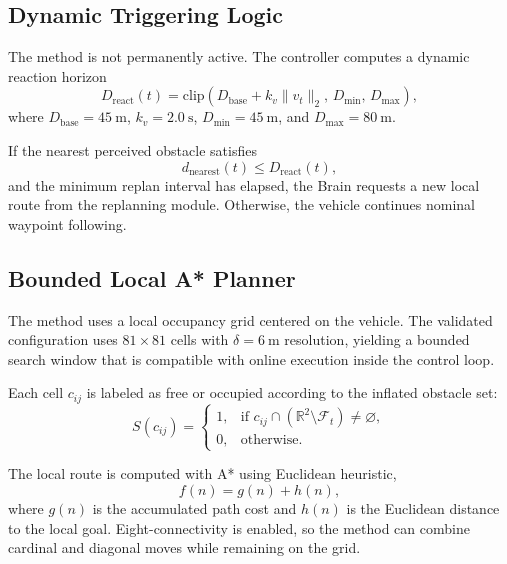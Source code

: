 \documentclass[a4paper,11pt]{article}
\begin{document}
\subsection{Dynamic Triggering Logic}

The method is not permanently active. The controller computes a dynamic reaction horizon
\begin{equation}
    D_{\mathrm{react}}(t) =
    \mathrm{clip}\!\left(D_{\mathrm{base}} + k_v \lVert v_t \rVert_2,\,
    D_{\min},\, D_{\max}\right),
\end{equation}
where \(D_{\mathrm{base}}=\SI{45}{\meter}\), \(k_v=\SI{2.0}{\second}\), \(D_{\min}=\SI{45}{\meter}\), and \(D_{\max}=\SI{80}{\meter}\).

If the nearest perceived obstacle satisfies
\begin{equation}
    d_{\mathrm{nearest}}(t) \le D_{\mathrm{react}}(t),
\end{equation}
and the minimum replan interval has elapsed, the Brain requests a new local route from the replanning module. Otherwise, the vehicle continues nominal waypoint following.

\subsection{Bounded Local A* Planner}

The method uses a local occupancy grid centered on the vehicle. The validated configuration uses \(81 \times 81\) cells with \(\delta=\SI{6}{\meter}\) resolution, yielding a bounded search window that is compatible with online execution inside the control loop.

Each cell \(c_{ij}\) is labeled as free or occupied according to the inflated obstacle set:
\begin{equation}
    S(c_{ij}) =
    \begin{cases}
        1, & \text{if } c_{ij} \cap \left(\mathbb{R}^2 \setminus \mathcal{F}_t\right) \neq \varnothing,\\
        0, & \text{otherwise.}
    \end{cases}
\end{equation}

The local route is computed with A* \cite{hart1968formal} using Euclidean heuristic,
\begin{equation}
    f(n) = g(n) + h(n),
\end{equation}
where \(g(n)\) is the accumulated path cost and \(h(n)\) is the Euclidean distance to the local goal. Eight-connectivity is enabled, so the method can combine cardinal and diagonal moves while remaining on the grid.
\end{document}
